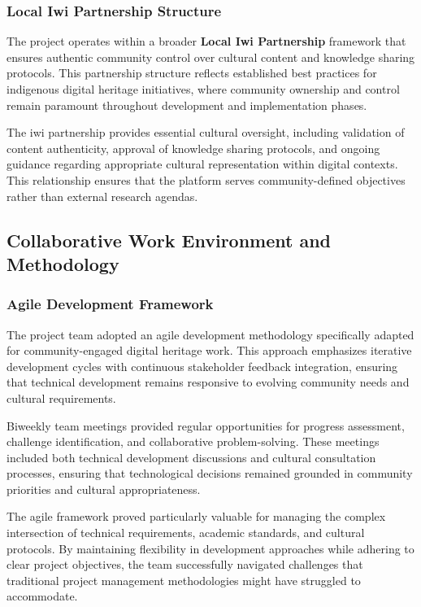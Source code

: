 \subsubsection{Local Iwi Partnership Structure}

The project operates within a broader \textbf{Local Iwi Partnership} framework that ensures authentic community control over cultural content and knowledge sharing protocols. This partnership structure reflects established best practices for indigenous digital heritage initiatives, where community ownership and control remain paramount throughout development and implementation phases.

The iwi partnership provides essential cultural oversight, including validation of content authenticity, approval of knowledge sharing protocols, and ongoing guidance regarding appropriate cultural representation within digital contexts. This relationship ensures that the platform serves community-defined objectives rather than external research agendas.

\subsection{Collaborative Work Environment and Methodology}

\subsubsection{Agile Development Framework}

The project team adopted an agile development methodology specifically adapted for community-engaged digital heritage work. This approach emphasizes iterative development cycles with continuous stakeholder feedback integration, ensuring that technical development remains responsive to evolving community needs and cultural requirements.

Biweekly team meetings provided regular opportunities for progress assessment, challenge identification, and collaborative problem-solving. These meetings included both technical development discussions and cultural consultation processes, ensuring that technological decisions remained grounded in community priorities and cultural appropriateness.

The agile framework proved particularly valuable for managing the complex intersection of technical requirements, academic standards, and cultural protocols. By maintaining flexibility in development approaches while adhering to clear project objectives, the team successfully navigated challenges that traditional project management methodologies might have struggled to accommodate.

